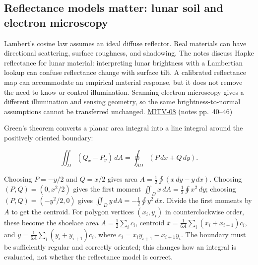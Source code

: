 \subsection{Reflectance models matter: lunar soil and electron microscopy}\label{04-visual-computing-ii-ch032-reflectance-models-matter-lunar-soil-and-electron-microscopy}

\hypertarget{04-visual-computing-ii-ch032-reflectance-models-matter-lunar-soil-and-electron-microscopy}{}

Lambert's cosine law assumes an ideal diffuse reflector. Real materials can have directional scattering, surface roughness, and shadowing. The notes discuss Hapke reflectance for lunar material: interpreting lunar brightness with a Lambertian lookup can confuse reflectance change with surface tilt. A calibrated reflectance map can accommodate an empirical material response, but it does not remove the need to know or control illumination. Scanning electron microscopy gives a different illumination and sensing geometry, so the same brightness-to-normal assumptions cannot be transferred unchanged. \hyperref[04-visual-computing-ii-ch036-mitv-08---shading-special-cases-lunar-surface-scanning-electron-microscope-greens-theorem]{MITV-08} (notes pp.~40--46)

Green's theorem converts a planar area integral into a line integral around the positively oriented boundary:

\[
\iint_D (Q_x-P_y)\,dA=\oint_{\partial D}(P\,dx+Q\,dy).
\]

Choosing \(P=-y/2\) and \(Q=x/2\) gives area \(A=\tfrac12\oint(x\,dy-y\,dx)\). Choosing \((P,Q)=(0,x^2/2)\) gives the first moment \(\iint_Dx\,dA=\tfrac12\oint x^2\,dy\); choosing \((P,Q)=(-y^2/2,0)\) gives \(\iint_Dy\,dA=-\tfrac12\oint y^2\,dx\). Divide the first moments by \(A\) to get the centroid. For polygon vertices \((x_i,y_i)\) in counterclockwise order, these become the shoelace area \(A=\tfrac12\sum_i c_i\), centroid \(\bar x=\frac{1}{6A}\sum_i(x_i+x_{i+1})c_i\), and \(\bar y=\frac{1}{6A}\sum_i(y_i+y_{i+1})c_i\), where \(c_i=x_i y_{i+1}-x_{i+1}y_i\). The boundary must be sufficiently regular and correctly oriented; this changes how an integral is evaluated, not whether the reflectance model is correct.

